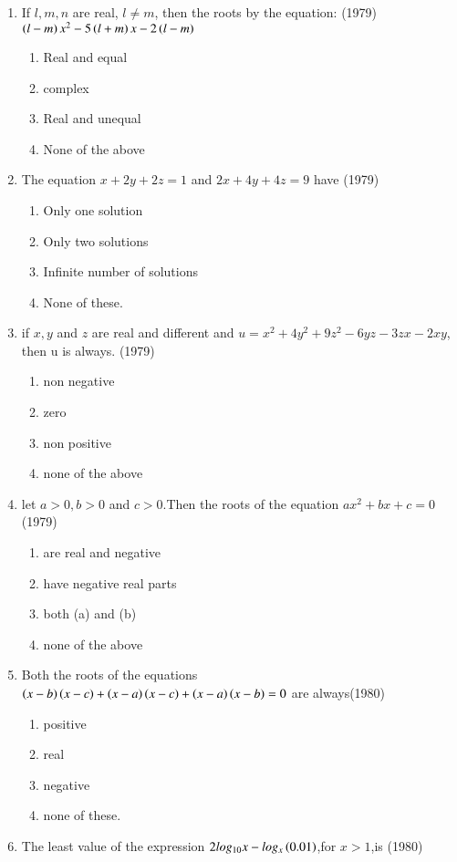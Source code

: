 \documentclass[journal,12pt,twocolumn]{IEEEtran}
\theoremstyle{remark}
\begin{document}
\begin{enumerate}
\item If $l,m,n$ are real, $l\neq m$, then the roots by the equation: 
\hfill (1979)
 $\left(l-m\right)x^2-5\left(l+m\right)x-2\left(l-m\right)$
\begin{enumerate}
\item Real and equal
\item complex
\item Real and unequal
\item None of the above 
\end{enumerate}
\item The equation $x+2y+2z=1$ and $2x+4y+4z=9$ have \hfill (1979)
\begin{enumerate}
\item Only one solution
\item Only two solutions
\item Infinite number of solutions
\item None of these.
\end{enumerate}
\item if $x,y$ and $z$ are real and different and 
$u=x^2+4y^2+9z^2-6yz-3zx-2xy$, then u is always.
\hfill (1979)
\begin{enumerate}
\item non negative
\item zero
\item non positive
\item none of the above
\end{enumerate}
\item let $a>0,b>0$ and $c>0$.Then the roots of  the equation 
$ax^2+bx+c=0$ \hfill (1979)
\begin{enumerate} 
\item are real and negative
\item have negative real parts
\item both (a) and (b)
\item none of the above
\end{enumerate}
\item Both the roots of the equations 
$\left(x-b\right)\left(x-c\right)+\left(x-a\right)\left(x-c\right)+\left(x-a\right)\left(x-b\right) = 0$ are always\hfill (1980)
\begin{enumerate} 
\item positive
\item real
\item negative
\item none of these.
\end{enumerate}
\item The least value of the expression $2log_{10} x-log_x\left(0.01\right)$,for $x>1$,is \hfill (1980)

\end{enumerate}
\end{document}
